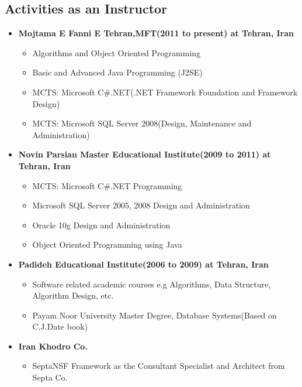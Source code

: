 \documentclass[12pt,a4paper]{article}
\begin{document}
\begin{mdframed}[leftmargin=10pt,rightmargin=10pt]      
\section{Activities as an Instructor}
		\begin{itemize}
			\item \textbf{Mojtama E Fanni E Tehran,MFT(2011 to present) at Tehran, Iran}
				\begin{itemize}
					\item Algorithms and Object Oriented Programming
					\item Basic and Advanced Java Programming (J2SE)
					\item MCTS: Microsoft C\#.NET(.NET Framework Foundation and Framework Design)
					\item MCTS: Microsoft SQL Server 2008(Design, Maintenance and Administration)
				\end{itemize}
			\item \textbf{Novin Parsian Master Educational Institute(2009 to 2011) at Tehran, Iran}
				\begin{itemize}
					\item MCTS: Microsoft C\#.NET Programming					
					\item Microsoft SQL Server 2005, 2008 Design and Administration
					\item Oracle 10g Design and Administration
					\item Object Oriented Programming using Java
				\end{itemize}
			\item \textbf{Padideh Educational Institute(2006 to 2009) at Tehran, Iran}
				\begin{itemize}
					\item Software related academic courses e.g Algorithms, Data Structure, Algorithm Design, etc.
					\item Payam Noor University Master Degree, Database Systems(Based on C.J.Date book)
				\end{itemize}
			\item \textbf{Iran Khodro Co.}
				\begin{itemize}
					\item SeptaNSF Framework as the Consultant Specialist and Architect from Septa Co.
				\end{itemize}
		\end{itemize}
\end{mdframed}
\end{document}
